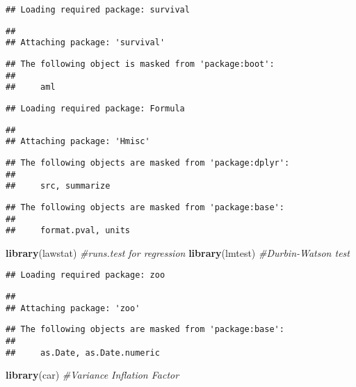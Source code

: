 \documentclass[]{article}
\newenvironment{Shaded}{\begin{snugshade}}{\end{snugshade}}
\newcommand{\CommentTok}[1]{\textcolor[rgb]{0.56,0.35,0.01}{\textit{#1}}}
\newcommand{\KeywordTok}[1]{\textcolor[rgb]{0.13,0.29,0.53}{\textbf{#1}}}
\newcommand{\NormalTok}[1]{#1}
\begin{document}
\begin{verbatim}
## Loading required package: survival
\end{verbatim}

\begin{verbatim}
## 
## Attaching package: 'survival'
\end{verbatim}

\begin{verbatim}
## The following object is masked from 'package:boot':
## 
##     aml
\end{verbatim}

\begin{verbatim}
## Loading required package: Formula
\end{verbatim}

\begin{verbatim}
## 
## Attaching package: 'Hmisc'
\end{verbatim}

\begin{verbatim}
## The following objects are masked from 'package:dplyr':
## 
##     src, summarize
\end{verbatim}

\begin{verbatim}
## The following objects are masked from 'package:base':
## 
##     format.pval, units
\end{verbatim}

\begin{Shaded}
\begin{Highlighting}[]
\KeywordTok{library}\NormalTok{(lawstat)    }\CommentTok{#runs.test for regression}
\KeywordTok{library}\NormalTok{(lmtest)     }\CommentTok{#Durbin-Watson test}
\end{Highlighting}
\end{Shaded}

\begin{verbatim}
## Loading required package: zoo
\end{verbatim}

\begin{verbatim}
## 
## Attaching package: 'zoo'
\end{verbatim}

\begin{verbatim}
## The following objects are masked from 'package:base':
## 
##     as.Date, as.Date.numeric
\end{verbatim}

\begin{Shaded}
\begin{Highlighting}[]
\KeywordTok{library}\NormalTok{(car)        }\CommentTok{#Variance Inflation Factor}
\end{Highlighting}
\end{Shaded}
\end{document}
